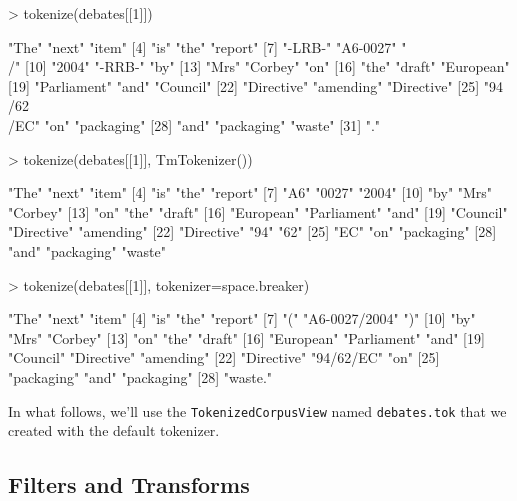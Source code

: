 \documentclass[11pt]{article}
\let\code=\texttt
\let\rclass=\texttt
\begin{document}
\begin{Schunk}
\begin{Sinput}
> tokenize(debates[[1]])
\end{Sinput}
\begin{Soutput}
 [1] "The"          "next"         "item"        
 [4] "is"           "the"          "report"      
 [7] "-LRB-"        "A6-0027"      "\\/"         
[10] "2004"         "-RRB-"        "by"          
[13] "Mrs"          "Corbey"       "on"          
[16] "the"          "draft"        "European"    
[19] "Parliament"   "and"          "Council"     
[22] "Directive"    "amending"     "Directive"   
[25] "94\\/62\\/EC" "on"           "packaging"   
[28] "and"          "packaging"    "waste"       
[31] "."           
\end{Soutput}
\begin{Sinput}
> tokenize(debates[[1]], TmTokenizer())
\end{Sinput}
\begin{Soutput}
 [1] "The"        "next"       "item"      
 [4] "is"         "the"        "report"    
 [7] "A6"         "0027"       "2004"      
[10] "by"         "Mrs"        "Corbey"    
[13] "on"         "the"        "draft"     
[16] "European"   "Parliament" "and"       
[19] "Council"    "Directive"  "amending"  
[22] "Directive"  "94"         "62"        
[25] "EC"         "on"         "packaging" 
[28] "and"        "packaging"  "waste"     
\end{Soutput}
\begin{Sinput}
> tokenize(debates[[1]], tokenizer=space.breaker)
\end{Sinput}
\begin{Soutput}
 [1] "The"          "next"         "item"        
 [4] "is"           "the"          "report"      
 [7] "("            "A6-0027/2004" ")"           
[10] "by"           "Mrs"          "Corbey"      
[13] "on"           "the"          "draft"       
[16] "European"     "Parliament"   "and"         
[19] "Council"      "Directive"    "amending"    
[22] "Directive"    "94/62/EC"     "on"          
[25] "packaging"    "and"          "packaging"   
[28] "waste."      
\end{Soutput}
\end{Schunk}
In what follows, we'll use the \rclass{TokenizedCorpusView} named
\code{debates.tok} that we created with the default tokenizer.

\subsection{Filters and Transforms}
\end{document}
